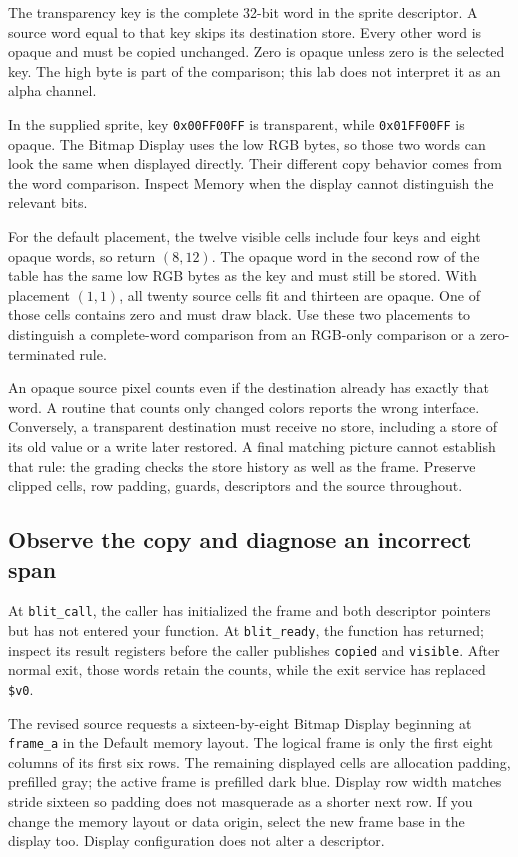 The transparency key is the complete 32-bit word in the sprite descriptor. A
source word equal to that key skips its destination store. Every other word is
opaque and must be copied unchanged. Zero is opaque unless zero is the selected
key. The high byte is part of the comparison; this lab does not interpret it as
an alpha channel.

In the supplied sprite, key \texttt{0x00FF00FF} is transparent, while
\texttt{0x01FF00FF} is opaque. The Bitmap Display uses the low RGB bytes, so those
two words can look the same when displayed directly. Their different copy behavior
comes from the word comparison. Inspect Memory when the display cannot distinguish
the relevant bits.



For the default placement, the twelve visible cells include four keys and eight
opaque words, so return $(8,12)$. The opaque word in the second row of the table
has the same low RGB bytes as the key and must still be stored. With placement
$(1,1)$, all twenty source cells fit and thirteen are opaque. One of those cells
contains zero and must draw black. Use these two placements to distinguish a
complete-word comparison from an RGB-only comparison or a zero-terminated rule.

An opaque source pixel counts even if the destination already has exactly that
word. A routine that counts only changed colors reports the wrong interface.
Conversely, a transparent destination must receive no store, including a store
of its old value or a write later restored. A final matching picture cannot
establish that rule: the grading checks the store history as well as the frame.
Preserve clipped cells, row padding, guards, descriptors and the source throughout.

\subsection*{Observe the copy and diagnose an incorrect span}

At \texttt{blit\_call}, the caller has initialized the frame and both descriptor
pointers but has not entered your function. At \texttt{blit\_ready}, the function
has returned; inspect its result registers before the caller publishes
\texttt{copied} and \texttt{visible}. After normal exit, those words retain the
counts, while the exit service has replaced \texttt{\$v0}.

The revised source requests a sixteen-by-eight Bitmap Display beginning at
\texttt{frame\_a} in the Default memory layout. The logical frame is only the
first eight columns of its first six rows. The remaining displayed cells are
allocation padding, prefilled gray; the active frame is prefilled dark blue.
Display row width matches stride sixteen so padding does not masquerade as a
shorter next row. If you change the memory layout or data origin, select the new
frame base in the display too. Display configuration does not alter a descriptor.

